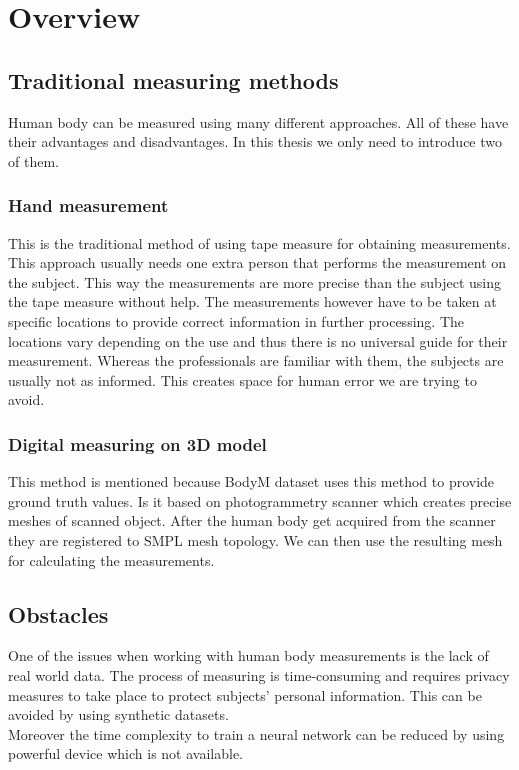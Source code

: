 \chapter{Overview}


\section{Traditional measuring methods}
Human body can be measured using many different approaches. All of these have their advantages and disadvantages. In this thesis we only need to introduce two of them.

\subsection{Hand measurement}
This is the traditional method of using tape measure for obtaining measurements. This approach usually needs one extra person that performs the measurement on the subject. This way the measurements are more precise than the subject using the tape measure without help. The measurements however have to be taken at specific locations to provide correct information in further processing. The locations vary depending on the use and thus there is no universal guide for their measurement. Whereas the professionals are familiar with them, the subjects are usually not as informed. This creates space for human error we are trying to avoid.

\subsection{Digital measuring on 3D model}
This method is mentioned because BodyM dataset uses this method to provide ground truth values. Is it based on photogrammetry scanner which creates precise meshes of scanned object. After the human body get acquired from the scanner they are registered to SMPL mesh topology. We can then use the resulting mesh for calculating the measurements.


\section{Obstacles}
One of the issues when working with human body measurements is the lack of real world data. The process of measuring is time-consuming and requires privacy measures to take place to protect subjects' personal information. This can be avoided by using synthetic datasets.\\
Moreover the time complexity to train a neural network can be reduced by using powerful device which is not available.


